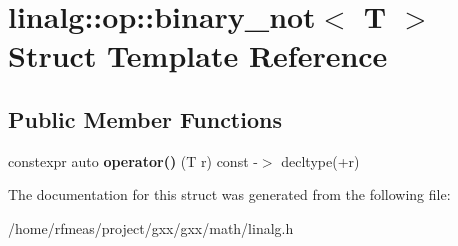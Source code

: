\hypertarget{structlinalg_1_1op_1_1binary__not}{}\section{linalg\+:\+:op\+:\+:binary\+\_\+not$<$ T $>$ Struct Template Reference}
\label{structlinalg_1_1op_1_1binary__not}
\subsection*{Public Member Functions}
\begin{DoxyCompactItemize}
\item 
constexpr auto {\bfseries operator()} (T r) const -\/$>$ decltype(+r)\hypertarget{structlinalg_1_1op_1_1binary__not_aea163eb0110bd7ddd33f483f9b5379db}{}\label{structlinalg_1_1op_1_1binary__not_aea163eb0110bd7ddd33f483f9b5379db}

\end{DoxyCompactItemize}


The documentation for this struct was generated from the following file\+:\begin{DoxyCompactItemize}
\item 
/home/rfmeas/project/gxx/gxx/math/linalg.\+h\end{DoxyCompactItemize}
